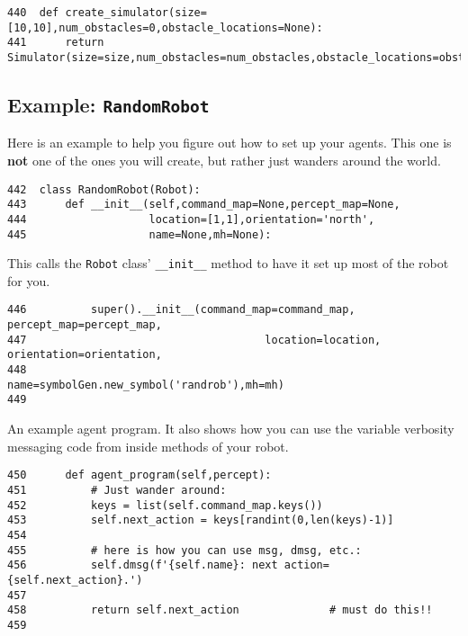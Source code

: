 \documentclass[11pt]{tufte-handout}
\begin{document}
\begin{verbatim}
440  def create_simulator(size=[10,10],num_obstacles=0,obstacle_locations=None):
441      return Simulator(size=size,num_obstacles=num_obstacles,obstacle_locations=obstacle_locations)
\end{verbatim}

\subsection{Example: \texttt{RandomRobot}}
\label{sec:org6b020dd}

Here is an example to help you figure out how to set up your agents.  This one is \textbf{not} one of the ones you will create, but rather just wanders around the world.

\begin{verbatim}
442  class RandomRobot(Robot):
443      def __init__(self,command_map=None,percept_map=None,
444                   location=[1,1],orientation='north',
445                   name=None,mh=None):
\end{verbatim}

This calls the \texttt{Robot} class' \texttt{\_\_init\_\_} method to have it set up most of the robot for you.
\begin{verbatim}
446          super().__init__(command_map=command_map, percept_map=percept_map,
447                                     location=location, orientation=orientation,
448                                     name=symbolGen.new_symbol('randrob'),mh=mh)
449  
\end{verbatim}

An example agent program.  It also shows how you can use the variable verbosity messaging code from inside methods of your robot.

\begin{verbatim}
450      def agent_program(self,percept):
451          # Just wander around:
452          keys = list(self.command_map.keys())
453          self.next_action = keys[randint(0,len(keys)-1)]
454  
455          # here is how you can use msg, dmsg, etc.:
456          self.dmsg(f'{self.name}: next action={self.next_action}.')
457  
458          return self.next_action              # must do this!!
459  
\end{verbatim}
\end{document}
